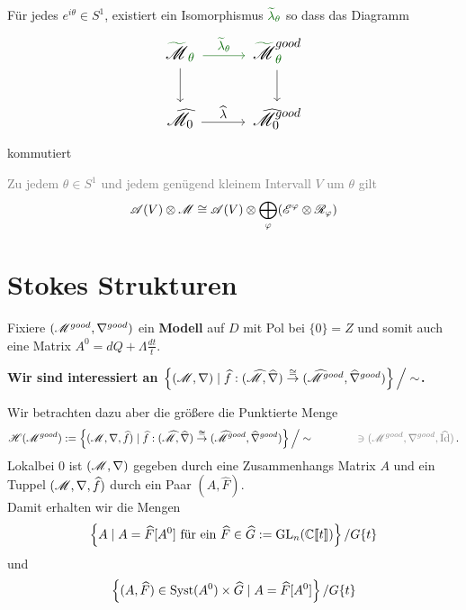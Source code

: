 \begin{paracol}{2} %
  \begin{thm}
    Für jedes $e^{i\theta}\in S^1$, existiert ein Isomorphismus
    $\textcolor{green!40!black}{\tilde\lambda_\theta}$ so dass das Diagramm
    \[ \Large\begin{tikzcd}
        \textcolor{green!40!black}{\tilde{\textcolor{black}{\sM}}_\theta}
        \dar \rar[green!40!black]{\tilde\lambda_\theta}&
        \textcolor{green!40!black}{%
        \tilde{\textcolor{black}{\sM}}_\theta^{\textcolor{black}{good}}}\dar
        \\\hat\sM_0 \rar{\hat\lambda} &
        \hat\sM_0^{good}
    \end{tikzcd} \]
    kommutiert
  \end{thm}
\switchcolumn %
\begin{thm}
  \textcolor{gray}{%
    Zu jedem $\theta\in S^1$ und jedem genügend kleinem Intervall $V$ um
    $\theta$ gilt
    \[
      \mathscr{A}(V)\otimes\mathscr{M}\cong\mathscr{A}(V)\otimes\bigoplus_\varphi(\mathscr{E}^\varphi\otimes\mathscr{R}_\varphi)
    \]
  }
\end{thm}
\end{paracol} %
\section{Stokes Strukturen} %
Fixiere $(\mathscr{M}^{good},\nabla^{good})$ ein \textbf{Modell} auf $D$ mit Pol bei
$\{0\}=Z$ und somit auch eine Matrix $A^0=dQ+\Lambda\frac{dt}{t}$.

\begin{center}
  \textbf{Wir sind interessiert an
    $\left\{(\mathscr{M},\nabla)
        \mid \widehat f:(\widehat{\mathscr{M}},\widehat\nabla)
          \overset{\cong}\to
          (\widehat{\mathscr{M}}^{good},\widehat\nabla^{good})
      \right\}\Big/\sim$.}
\end{center}
Wir betrachten dazu aber die größere die Punktierte Menge 
\[
  \sH(\sM^{good}):=\left\{(\sM,\nabla,\hat f)
      \mid \hat f:(\hat\sM,\hat\nabla)
        \overset{\cong}\to
        (\hat\sM^{good},\hat\nabla^{good})
    \right\}\Big/\sim
    \qquad \qquad
    \textcolor{gray}{\ni (\sM^{good},\nabla^{good},\hat \Id)}\,.
\]
Lokal\TODO[am Halm] bei $0$ ist $(\mathscr{M},\nabla)$ gegeben durch eine
Zusammenhangs Matrix $A$ und ein Tuppel $(\mathscr{M},\nabla,\widehat f)$ durch ein Paar
$(A,\hat F)$.
\\Damit erhalten wir die Mengen
\[
  \left\{A \mid A=\widehat F[A^0]\text{ für ein }\widehat F\in\widehat G
    :=\operatorname{GL}_n(\mathbb{C}\llbracket t\rrbracket)\right\}/G\{t\}
\]
und
\[
  \left\{(A,\widehat F)\in\operatorname{Syst}(A^0)\times\widehat G\mid A=\widehat F[A^0]\right\}/G\{t\}
\]

